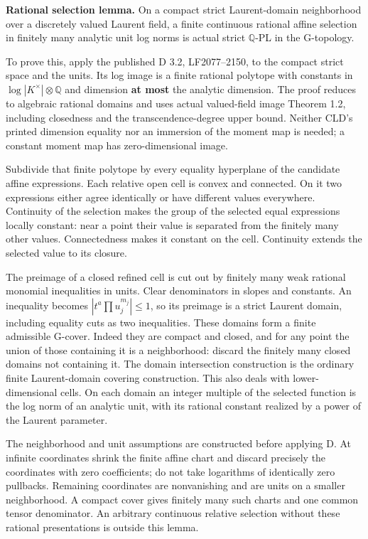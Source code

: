 \documentclass[
  11pt,
]{article}
\begin{document}
\textbf{Rational selection lemma.} On a compact strict Laurent-domain
neighborhood over a discretely valued Laurent field, a finite continuous
rational affine selection in finitely many analytic unit log norms is
actual strict \(\mathbb Q\)-PL in the G-topology.

To prove this, apply the published D 3.2, LF2077--2150, to the compact
strict space and the units. Its log image is a finite rational polytope
with constants in \(\log|K^\times|\otimes\mathbb Q\) and dimension
\textbf{at most} the analytic dimension. The proof reduces to algebraic
rational domains and uses actual valued-field image Theorem 1.2,
including closedness and the transcendence-degree upper bound. Neither
CLD's printed dimension equality nor an immersion of the moment map is
needed; a constant moment map has zero-dimensional image.

Subdivide that finite polytope by every equality hyperplane of the
candidate affine expressions. Each relative open cell is convex and
connected. On it two expressions either agree identically or have
different values everywhere. Continuity of the selection makes the group
of the selected equal expressions locally constant: near a point their
value is separated from the finitely many other values. Connectedness
makes it constant on the cell. Continuity extends the selected value to
its closure.

The preimage of a closed refined cell is cut out by finitely many weak
rational monomial inequalities in units. Clear denominators in slopes
and constants. An inequality becomes \(|t^a\prod u_j^{m_j}|\le1\), so
its preimage is a strict Laurent domain, including equality cuts as two
inequalities. These domains form a finite admissible G-cover. Indeed
they are compact and closed, and for any point the union of those
containing it is a neighborhood: discard the finitely many closed
domains not containing it. The domain intersection construction is the
ordinary finite Laurent-domain covering construction. This also deals
with lower-dimensional cells. On each domain an integer multiple of the
selected function is the log norm of an analytic unit, with its rational
constant realized by a power of the Laurent parameter.

The neighborhood and unit assumptions are constructed before applying D.
At infinite coordinates shrink the finite affine chart and discard
precisely the coordinates with zero coefficients; do not take logarithms
of identically zero pullbacks. Remaining coordinates are nonvanishing
and are units on a smaller neighborhood. A compact cover gives finitely
many such charts and one common tensor denominator. An arbitrary
continuous relative selection without these rational presentations is
outside this lemma.
\end{document}

